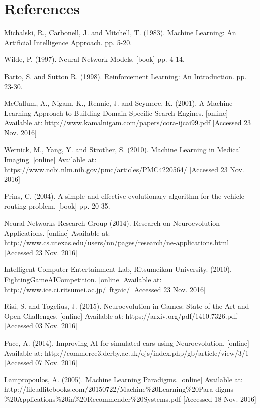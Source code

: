 \documentclass[11pt,a4paper]{article}
\begin{document}
\section{References}
\begin{thebibliography}{10}

	Michalski, R., Carbonell, J. and Mitchell, T.
	(1983).
	Machine Learning: An Artificial Intelligence Approach. 
	pp. 5-20.
	

	Wilde, P.
	(1997).
	Neural Network Models.
	[book]
	pp. 4-14.
	
	Barto, S. and Sutton R.
	(1998).
	Reinforcement Learning: An Introduction.
	pp. 23-30.
	
	McCallum, A., Nigam, K., Rennie, J. and Seymore, K.
	(2001).
	A Machine Learning Approach to Building Domain-Specific Search Engines.
	[online]
	Available at: http://www.kamalnigam.com/papers/cora-ijcai99.pdf
	[Accessed 23 Nov. 2016]
	
	Wernick, M., Yang, Y. and Strother, S.
	(2010).
	Machine Learning in Medical Imaging.
	[online]
	Available at: https://www.ncbi.nlm.nih.gov/pmc/articles/PMC4220564/
	[Accessed 23 Nov. 2016]
	
	Prins, C.
	(2004).
	A simple and effective evolutionary algorithm for the vehicle routing problem.
	[book]
	pp. 20-35.	

	Neural Networks Research Group
	(2014).
	Research on Neuroevolution Applications.
	[online]
	Available at: http://www.cs.utexas.edu/users/nn/pages/research/ne-applications.html
	[Accessed 23 Nov. 2016]
	
	Intelligent Computer Entertainment Lab, Ritsumeikan University.
	(2010).
	FightingGameAICompetition.
	[online]
	Available at: http://www.ice.ci.ritsumei.ac.jp/~ftgaic/
	[Accessed 23 Nov. 2016]

	Risi, S. and Togelius, J.
	(2015).
	Neuroevolution in Games: State of the Art and Open Challenges.
  	[online]
  	Available at: https://arxiv.org/pdf/1410.7326.pdf
  	[Accessed 03 Nov. 2016]

	Pace, A.
	(2014).
	Improving AI for simulated cars using Neuroevolution.
	[online]
	Available at: http://commerce3.derby.ac.uk/ojs/index.php/gb/article/view/3/1
	[Accessed 07 Nov. 2016]
	
	Lampropoulos, A.
	(2005).
	Machine Learning Paradigms.
	[online]
	Available at: http://file.allitebooks.com/20150722/Machine\%20Learning\%20Para-digms-\%20Applications\%20in\%20Recommender\%20Systems.pdf
	[Accessed 18 Nov. 2016]
  

\end{thebibliography}
\end{document}
